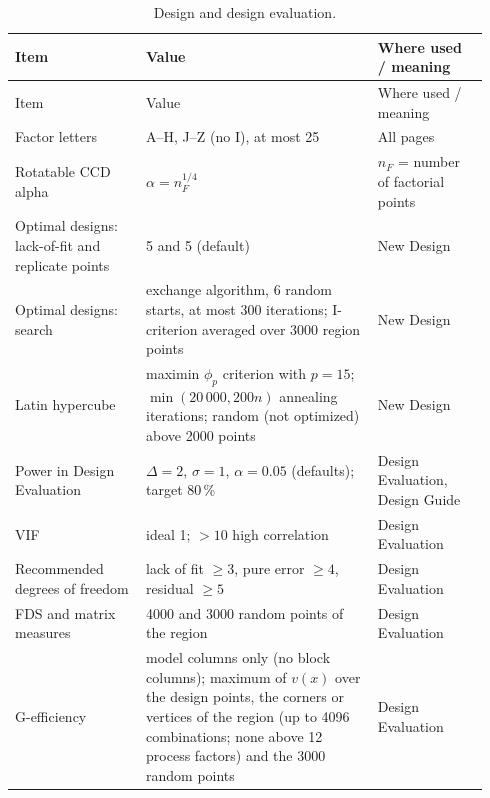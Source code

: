 {\small\begin{longtable}{@{}p{0.26\linewidth}p{0.46\linewidth}p{0.22\linewidth}@{}}
\caption{Design and design evaluation.}\label{tab:a-const-design}\\
\toprule
Item & Value & Where used / meaning \\
\midrule
\endfirsthead
\toprule
Item & Value & Where used / meaning \\
\midrule
\endhead
\bottomrule
\endfoot
Factor letters & A--H, J--Z (no I), at most 25 & All pages \\
Rotatable CCD alpha & $\alpha = n_F^{1/4}$ & $n_F$ = number of factorial points \\
Optimal designs: lack-of-fit and replicate points & 5 and 5 (default) & New Design \\
Optimal designs: search & exchange algorithm, 6 random starts, at most 300 iterations; I-criterion averaged over 3000
  region points & New Design \\
Latin hypercube & maximin $\phi_p$ criterion with $p=15$; $\min(20\,000, 200n)$ annealing iterations; random
  (not optimized) above 2000 points & New Design \\
Power in Design Evaluation & $\Delta = 2$, $\sigma = 1$, $\alpha = 0.05$ (defaults); target 80\,\% & Design
  Evaluation, Design Guide \\
VIF & ideal 1; $> 10$ high correlation & Design Evaluation \\
Recommended degrees of freedom & lack of fit $\ge 3$, pure error $\ge 4$, residual $\ge 5$ & Design Evaluation \\
FDS and matrix measures & 4000 and 3000 random points of the region & Design Evaluation \\
G-efficiency & model columns only (no block columns); maximum of $v(x)$ over the design points, the corners or
  vertices of the region (up to 4096 combinations; none above 12 process factors) and the 3000 random points & Design
  Evaluation \\
\end{longtable}}

